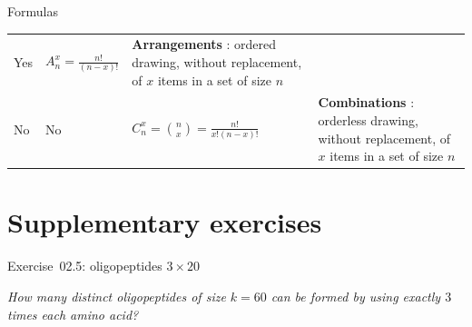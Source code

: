 \documentclass[ignorenonframetext,]{beamer}
\begin{document}
\begin{frame}{Formulas}
\begin{longtable}[]{@{}llll@{}}
\begin{minipage}[t]{0.10\columnwidth}
Yes\strut
\end{minipage} & \begin{minipage}[t]{0.18\columnwidth}\raggedright
\(A^x_n = \frac{n!}{(n-x)!}\)\strut
\end{minipage} & \begin{minipage}[t]{0.49\columnwidth}\raggedright
\textbf{Arrangements} : ordered drawing, without replacement, of \(x\)
items in a set of size \(n\)\strut
\end{minipage}\tabularnewline
\begin{minipage}[t]{0.12\columnwidth}\raggedright
No\strut
\end{minipage} & \begin{minipage}[t]{0.10\columnwidth}\raggedright
No\strut
\end{minipage} & \begin{minipage}[t]{0.18\columnwidth}\raggedright
\(C^x_n = \binom{n}{x} = \frac{n!}{x! (n - x) !}\)\strut
\end{minipage} & \begin{minipage}[t]{0.49\columnwidth}\raggedright
\textbf{Combinations} : orderless drawing, without replacement, of \(x\)
items in a set of size \(n\)\strut
\end{minipage}\tabularnewline
\bottomrule
\end{longtable}

\end{frame}

\hypertarget{supplementary-exercises}{%
\section{Supplementary exercises}\label{supplementary-exercises}}

\begin{frame}{Exercise~02.5: oligopeptides \(3 \times 20\)}
\protect\hypertarget{exercise02.5-oligopeptides-3-times-20}{}

\emph{How many distinct oligopeptides of size \(k=60\) can be formed by
using exactly \(3\) times each amino acid?}

\end{frame}
\end{document}
